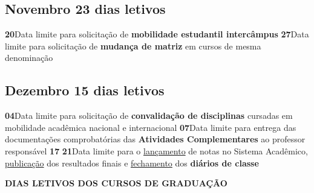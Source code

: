 \documentclass[thesis]{hmcposter}
\begin{document}
\begin{poster}
\subsection{Novembro \hfill 23 dias letivos}\textbf{20}\qquad Data limite para solicitação de \textbf{mobilidade estudantil intercâmpus} \newline \null\textbf{27}\qquad Data limite para solicitação de \textbf{mudança de matriz} em cursos de mesma denominação \newline \null\subsection{Dezembro \hfill 15 dias letivos}\textbf{04}\qquad Data limite para solicitação de \textbf{convalidação de disciplinas} cursadas em mobilidade acadêmica nacional e internacional \newline \null\textbf{07}\qquad Data limite para entrega das documentações comprobatórias das \textbf{Atividades Complementares} ao professor responsável \newline \null\textbf{17}\qquad {} \newline \null\textbf{21}\qquad Data limite para o \underline{lançamento} de notas no Sistema Acadêmico, \underline{publicação} dos resultados finais e \underline{fechamento} dos \textbf{diários de classe} \newline \null\newpage
~
\vfill
\begin{center}
\large \textbf{DIAS LETIVOS DOS CURSOS DE GRADUAÇÃO}
\newline
\null
\newline
\begin{table}
\centering
{}
\end{table}
\null
\end{center}
\vfill
\null
\columnbreak
~
\vfill
\begin{center}

\end{center}
\end{poster}
\end{document}
